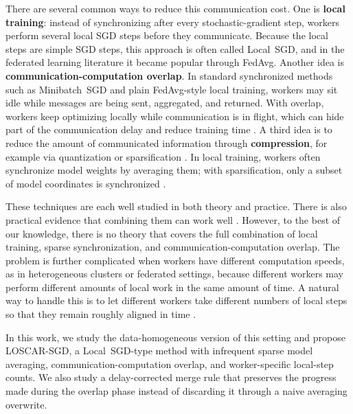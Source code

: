 \documentclass{article}
\theoremstyle{plain}
\theoremstyle{definition}
\newcommand{\algname}[1]{{\color{alggray}\small\sf#1}\xspace}
\newcommand{\loscar}{\algname{\color{oscar} LOSCAR}}
\newcommand{\loscarsgd}{\loscar-\sgd}
\newcommand{\minibatch}{\algname{Minibatch~SGD}}
\newcommand{\sgd}{\algname{SGD}}
\newcommand{\fedavg}{\algname{FedAvg}}
\newcommand{\localsgd}{\algname{Local~SGD}}
\begin{document}
There are several common ways to reduce this communication cost.
One is \textbf{local training}: instead of synchronizing after every stochastic-gradient step, workers perform several local \sgd steps before they communicate.
Because the local steps are simple \sgd steps, this approach is often called \localsgd \citep{zinkevich2010parallelized}, and in the federated learning literature it became popular through \fedavg \citep{mcmahan2017communication}.
Another idea is \textbf{communication-computation overlap}.
In standard synchronized methods such as \minibatch and plain \fedavg-style local training, workers may sit idle while messages are being sent, aggregated, and returned.
With overlap, workers keep optimizing locally while communication is in flight, which can hide part of the communication delay and reduce training time \citep{wang2020overlaplocalsgd, sun2024co2, kale2025eager}.
A third idea is to reduce the amount of communicated information through \textbf{compression}, for example via quantization or sparsification \citep{alistarh2017qsgd, wangni2018gradient}.
In local training, workers often synchronize model weights by averaging them; with sparsification, only a subset of model coordinates is synchronized \citep{fournier2024wash, beton2025sparta}.

These techniques are each well studied in both theory and practice.
There is also practical evidence that combining them can work well \citep{douillard2025streaming, ajanthan2026asyncmesh}.
However, to the best of our knowledge, there is no theory that covers the full combination of local training, sparse synchronization, and communication-computation overlap.
The problem is further complicated when workers have different computation speeds, as in heterogeneous clusters or federated settings, because different workers may perform different amounts of local work in the same amount of time.
A natural way to handle this is to let different workers take different numbers of local steps so that they remain roughly aligned in time \citep{li2020federated,
maranjyan2025ata, maranjyan2025gradskip}.

In this work, we study the data-homogeneous version of this setting and propose \loscarsgd, a \localsgd-type method with infrequent sparse model averaging, communication-computation overlap, and worker-specific local-step counts.
We also study a delay-corrected merge rule that preserves the progress made during the overlap phase instead of discarding it through a naive averaging overwrite.
\end{document}
